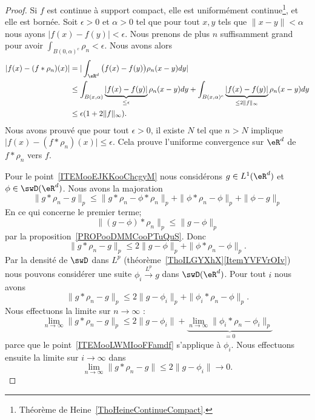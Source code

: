 \begin{proof}
    Si \( f\) est continue à support compact, elle est uniformément continue\footnote{Théorème de Heine~\ref{ThoHeineContinueCompact}.}, et elle est bornée. Soit \( \epsilon>0\) et \( \alpha>0\) tel que pour tout \( x,y\) tels que \( \| x-y \|<\alpha\) nous ayons \( | f(x)-f(y) |<\epsilon\). Nous prenons de plus \(n\) suffisamment grand pour avoir \( \int_{B(0,\alpha)^c}\rho_n<\epsilon\). Nous avons alors
    \begin{subequations}
        \begin{align}
            | f(x)-(f*\rho_n)(x) |&=| \int_{\eR^d}\big( f(x)-f(y) \big)\rho_n(x-y)dy |\\
            &\leq \int_{B(x,\alpha)}\underbrace{| f(x)-f(y) |}_{\leq \epsilon}\rho_n(x-y)dy+\int_{B(x,\alpha)^c}\underbrace{| f(x)-f(y) |}_{\leq 2\| f \|_{\infty}}\rho_n(x-y)dy\\
            &\leq \epsilon(1+2\| f \|_{\infty}).
        \end{align}
    \end{subequations}
    Nous avons prouvé que pour tout \( \epsilon>0\), il existe \( N\) tel que \( n>N\) implique \( \big| f(x)-(f*\rho_n)(x) \big|\leq \epsilon\). Cela prouve l'uniforme convergence sur \( \eR^d\) de \( f*\rho_n\) vers \( f\).

    Pour le point~\ref{ITEMooEJKKooChcgyM} nous considérons \( g\in L^1(\eR^d)\) et \( \phi\in \swD(\eR^d)\). Nous avons la majoration
    \begin{equation}
        \| g*\rho_n-g \|_p\leq \| g*\rho_n-\phi*\rho_n \|_p+\| \phi*\rho_n-\phi \|_p+\| \phi-g \|_p
    \end{equation}
    En ce qui concerne le premier terme;
    \begin{equation}
        \| (g-\phi)*\rho_n \|_p\leq \| g-\phi \|_p
    \end{equation}
    par la proposition~\ref{PROPooDMMCooPTuQuS}. Donc
    \begin{equation}
        \| g*\rho_n-g \|_p\leq 2\| g-\phi \|_p+\| \phi*\rho_n-\phi \|_p.
    \end{equation}
    Par la densité de \( \swD\) dans \( L^p\) (théorème~\ref{ThoILGYXhX}\ref{ItemYVFVrOIv}) nous pouvons considérer une suite \( \phi_i\stackrel{L^p}{\longrightarrow}g\) dans \( \swD(\eR^d)\). Pour tout \( i\) nous avons
    \begin{equation}
        \| g*\rho_n-g \|_p\leq 2\| g-\phi_i \|_p+\| \phi_i*\rho_n-\phi \|_p.
    \end{equation}
    Nous effectuons la limite sur \( n\to \infty\) :
    \begin{equation}
        \lim_{n\to \infty} \| g*\rho_n-g \|_p\leq 2\| g-\phi_i \|+\underbrace{\lim_{n\to \infty} \| \phi_i*\rho_n-\phi_i \|_p}_{=0}
    \end{equation}
    parce que le point~\ref{ITEMooLWMIooFFamdf} s'applique à \( \phi_i\). Nous effectuons ensuite la limite sur \( i\to \infty\) dans
    \begin{equation}
        \lim_{n\to \infty} \| g*\rho_n-g \|\leq 2\| g-\phi_i \|\to 0.
    \end{equation}
\end{proof}

